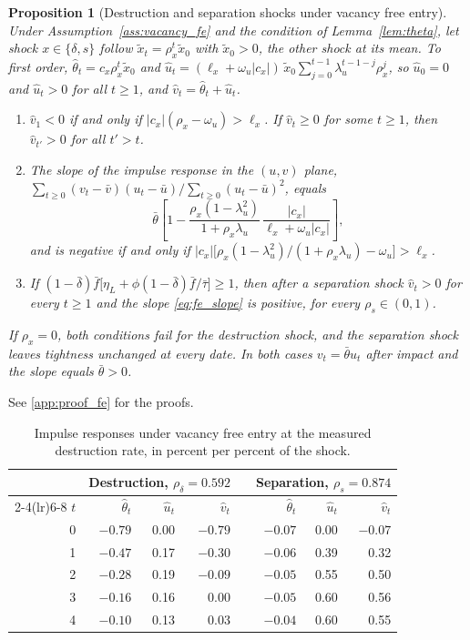 \documentclass[authoryear, review, 12pt]{elsarticle}
\newtheorem{proposition}{Proposition}
\begin{document}
\begin{proposition}[Destruction and separation shocks under vacancy free entry]\label{prop:fe}
Under Assumption~\ref{ass:vacancy_fe} and the condition of Lemma~\ref{lem:theta}, let shock $x\in\{\delta,s\}$ follow
$\tilde{x}_t=\rho_x^t\tilde{x}_0$ with $\tilde{x}_0>0$, the other shock at its mean. To
first order, $\hat\theta_t=c_x\rho_x^t\tilde{x}_0$ and
$\hat{u}_t=(\ell_x+\omega_u|c_x|)\,\tilde{x}_0\sum_{j=0}^{t-1}\lambda_u^{t-1-j}\rho_x^j$, so
$\hat{u}_0=0$ and $\hat{u}_t>0$ for all $t\geq1$, and $\hat{v}_t=\hat\theta_t+\hat{u}_t$.
\begin{enumerate}
	\item $\hat{v}_1<0$ if and only if $|c_x|(\rho_x-\omega_u)>\ell_x$. If $\hat{v}_t\geq0$
	for some $t\geq1$, then $\hat{v}_{t'}>0$ for all $t'>t$.
	\item The slope of the impulse response in the $(u,v)$ plane,
	$\sum_{t\geq0}(v_t-\bar{v})(u_t-\bar{u})/\sum_{t\geq0}(u_t-\bar{u})^2$, equals
	\begin{equation}\label{eq:fe_slope}
		\bar\theta\left[1-\frac{\rho_x(1-\lambda_u^2)}{1+\rho_x\lambda_u}\,
		\frac{|c_x|}{\ell_x+\omega_u|c_x|}\right],
	\end{equation}
	and is negative if and only if
	$|c_x|\bigl[\rho_x(1-\lambda_u^2)/(1+\rho_x\lambda_u)-\omega_u\bigr]>\ell_x$.
	\item If $(1-\bar\delta)\bar{f}\bigl[\eta_L+\phi(1-\bar\delta)\bar{f}/\bar\tau\bigr]\geq1$,
	then after a separation shock $\hat{v}_t>0$ for every $t\geq1$ and the slope
	\eqref{eq:fe_slope} is positive, for every $\rho_s\in(0,1)$.
\end{enumerate}
If $\rho_x=0$, both conditions fail for the destruction shock, and the separation shock
leaves tightness unchanged at every date. In both cases $v_t=\bar\theta u_t$ after impact
and the slope equals $\bar\theta>0$.
\end{proposition}
\noindent See \ref{app:proof_fe} for the proofs.

\begin{table}[h]
\centering
\caption{Impulse responses under vacancy free entry at the measured destruction rate, in percent per
percent of the shock.}
\label{tab:fe_irf}
\begin{tabular}{rrrrcrrr}
\toprule
 & \multicolumn{3}{c}{Destruction, $\rho_\delta=0.592$} & & \multicolumn{3}{c}{Separation, $\rho_s=0.874$} \\
\cmidrule(lr){2-4}\cmidrule(lr){6-8}
$t$ & $\hat\theta_t$ & $\hat{u}_t$ & $\hat{v}_t$ & & $\hat\theta_t$ & $\hat{u}_t$ & $\hat{v}_t$ \\
\midrule
0 & $-0.79$ & 0.00 & $-0.79$ & & $-0.07$ & 0.00 & $-0.07$ \\
1 & $-0.47$ & 0.17 & $-0.30$ & & $-0.06$ & 0.39 & 0.32 \\
2 & $-0.28$ & 0.19 & $-0.09$ & & $-0.05$ & 0.55 & 0.50 \\
3 & $-0.16$ & 0.16 & 0.00 & & $-0.05$ & 0.60 & 0.56 \\
4 & $-0.10$ & 0.13 & 0.03 & & $-0.04$ & 0.60 & 0.55 \\
\bottomrule
\end{tabular}
\end{table}
\end{document}
